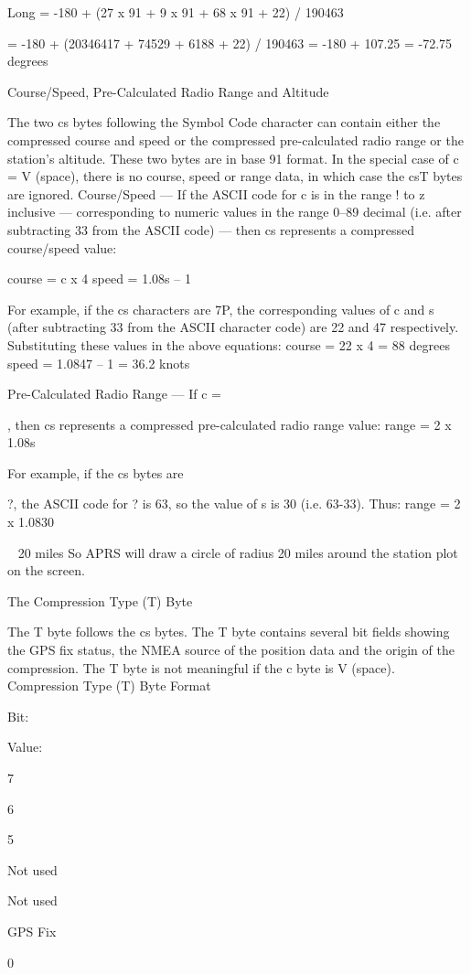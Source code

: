 {Long = -180 + (27 x 91 + 9 x 91 + 68 x 91 + 22) / 190463

= -180 + (20346417 + 74529 + 6188 + 22) / 190463
= -180 + 107.25
= -72.75 degrees

Course/Speed,
Pre-Calculated
Radio Range and
Altitude

The two cs bytes following the Symbol Code character can contain either
the compressed course and speed or the compressed pre-calculated radio
range or the station’s altitude. These two bytes are in base 91 format.
In the special case of c = V (space), there is no course, speed or range
data, in which case the csT bytes are ignored.
Course/Speed — If the ASCII code for c is in the range ! to z inclusive —
corresponding to numeric values in the range 0–89 decimal (i.e. after
subtracting 33 from the ASCII code) — then cs represents a compressed
course/speed value:




course = c x 4
speed = 1.08s – 1

For example, if the cs characters are 7P, the corresponding values of c and
s (after subtracting 33 from the ASCII character code) are 22 and 47
respectively. Substituting these values in the above equations:
course = 22 x 4 = 88 degrees
speed = 1.0847 – 1 = 36.2 knots

Pre-Calculated Radio Range — If c = {, then cs represents a compressed
pre-calculated radio range value:
range = 2 x 1.08s

For example, if the cs bytes are {?, the ASCII code for ? is 63, so the value
of s is 30 (i.e. 63-33). Thus:
range = 2 x 1.0830

~ 20 miles
So APRS will draw a circle of radius 20 miles around the station plot on the
screen.

The Compression
Type (T) Byte

The T byte follows the cs bytes. The T byte contains several bit fields
showing the GPS fix status, the NMEA source of the position data and the
origin of the compression.
The T byte is not meaningful if the c byte is V (space).
Compression Type (T) Byte Format

Bit:

Value:

7

6

5

Not used

Not used

GPS Fix

0

}}}
